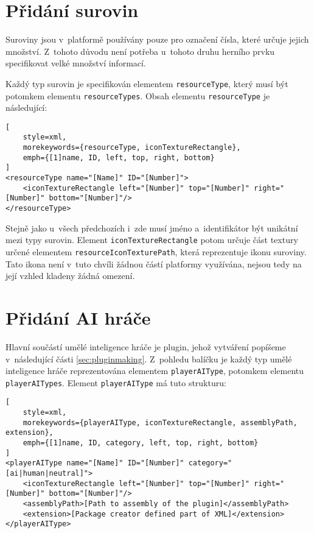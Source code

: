 \section{Přidání surovin}
Suroviny jsou v~platformě používány pouze pro označení čísla, které určuje jejich množství. Z~tohoto důvodu není potřeba u~tohoto druhu herního prvku specifikovat velké množství informací.

Každý typ surovin je specifikován elementem \texttt{resourceType}, který musí být potomkem elementu \texttt{resourceTypes}. Obsah elementu \texttt{resourceType} je následující:

\begin{lstlisting}[
	style=xml,
	morekeywords={resourceType, iconTextureRectangle},
	emph={[1]name, ID, left, top, right, bottom}
]
<resourceType name="[Name]" ID="[Number]">
	<iconTextureRectangle left="[Number]" top="[Number]" right="[Number]" bottom="[Number]"/>
</resourceType>
\end{lstlisting}

Stejně jako u~všech předchozích i~zde musí jméno a~identifikátor být unikátní mezi typy surovin. Element \texttt{iconTextureRectangle} potom určuje část textury určené elementem \texttt{resourceIconTexturePath}, která reprezentuje ikonu suroviny. Tato ikona není v~tuto chvíli žádnou částí platformy využívána, nejsou tedy na její vzhled kladeny žádná omezení.

\section{Přidání AI hráče}
Hlavní součástí umělé inteligence hráče je plugin, jehož vytváření popíšeme v~následující části \ref{sec:pluginmaking}. Z~pohledu balíčku je každý typ umělé inteligence hráče reprezentována elementem \texttt{playerAIType}, potomkem elementu \texttt{playerAITypes}. Element \texttt{playerAIType} má tuto strukturu:

\begin{lstlisting}[
	style=xml,
	morekeywords={playerAIType, iconTextureRectangle, assemblyPath, extension},
	emph={[1]name, ID, category, left, top, right, bottom}
]
<playerAIType name="[Name]" ID="[Number]" category="[ai|human|neutral]">
	<iconTextureRectangle left="[Number]" top="[Number]" right="[Number]" bottom="[Number]"/>
	<assemblyPath>[Path to assembly of the plugin]</assemblyPath>
	<extension>[Package creator defined part of XML]</extension>
</playerAIType>
\end{lstlisting}

